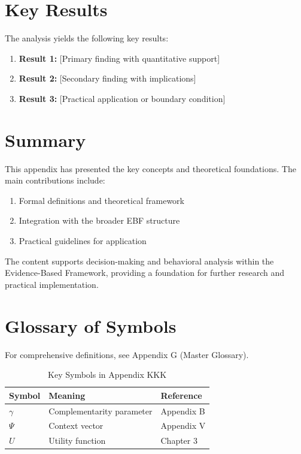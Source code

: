 \section{Key Results}
\label{sec:kkk-results}

The analysis yields the following key results:

\begin{enumerate}
    \item \textbf{Result 1:} [Primary finding with quantitative support]
    \item \textbf{Result 2:} [Secondary finding with implications]
    \item \textbf{Result 3:} [Practical application or boundary condition]
\end{enumerate}


\section{Summary}
\label{sec:kkk-summary}

This appendix has presented the key concepts and theoretical foundations.
The main contributions include:

\begin{enumerate}
    \item Formal definitions and theoretical framework
    \item Integration with the broader EBF structure
    \item Practical guidelines for application
\end{enumerate}

The content supports decision-making and behavioral analysis within the
Evidence-Based Framework, providing a foundation for further research
and practical implementation.



\section{Glossary of Symbols}
\label{sec:kkk-glossary}

For comprehensive definitions, see Appendix G (Master Glossary).

\begin{table}[htbp]
\centering
\caption{Key Symbols in Appendix KKK}
\begin{tabular}{lll}
\toprule
\textbf{Symbol} & \textbf{Meaning} & \textbf{Reference} \\
\midrule
$\gamma$ & Complementarity parameter & Appendix B \\
$\Psi$ & Context vector & Appendix V \\
$U$ & Utility function & Chapter 3 \\
\bottomrule
\end{tabular}
\end{table}




